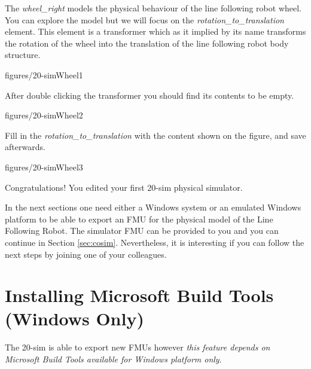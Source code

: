\documentclass[11pt,a4paper]{../tutorial}
\begin{document}
\begin{instructions}
\item The \emph{wheel\_right} models the physical behaviour of the line
	following robot wheel. You can explore the model but we will focus on
	the \emph{rotation\_to\_translation} element. This element is a
	transformer which as it implied by its name transforms the rotation of
	the wheel into the translation of the line following robot body
	structure.  

    \begin{annotation}[width=0.8\linewidth]{figures/20-simWheel1}
    \end{annotation}

\item After double clicking the transformer you should find its contents to be empty.

    \begin{annotation}[width=0.7\linewidth]{figures/20-simWheel2}
    \end{annotation}

\newpage

\item Fill in the \emph{rotation\_to\_translation} with the content shown on the figure, and save afterwards.

    \begin{annotation}[width=0.8\linewidth]{figures/20-simWheel3}
	    
    \end{annotation}

\end{instructions}

Congratulations! You edited your first 20-sim physical simulator.

In the next
sections one need either a Windows system or an emulated Windows platform to be
able to export an FMU for the physical model of the Line Following Robot. The
simulator FMU can be provided to you and you can continue in Section
\ref{sec:cosim}. Nevertheless, it is interesting if you can follow the next
steps by joining one of your colleagues. 

\newpage

\section{Installing Microsoft Build Tools (Windows Only)} The 20-sim is able to export new FMUs however \emph{this feature depends on Microsoft Build Tools available for Windows platform only}.
\end{document}
